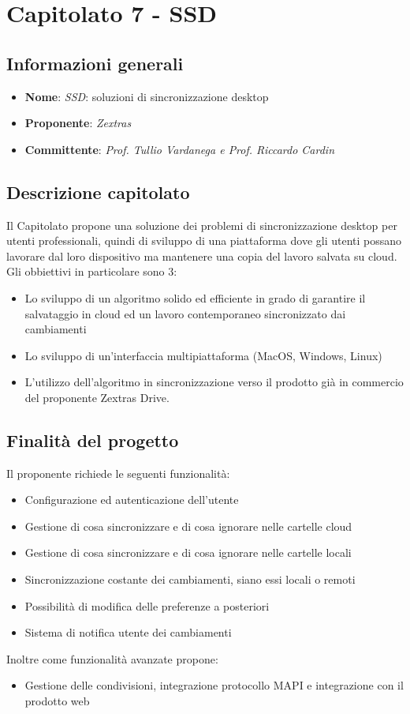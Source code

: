 \section{Capitolato 7 - SSD}
\subsection{Informazioni generali}
\begin{itemize}
    \item \textbf{Nome}: \emph{SSD}: soluzioni di sincronizzazione desktop
    \item \textbf{Proponente}: \emph{Zextras}
    \item \textbf{Committente}: \emph{Prof. Tullio Vardanega e Prof. Riccardo Cardin}
\end{itemize}
\subsection{Descrizione capitolato}
Il Capitolato propone una soluzione dei problemi di sincronizzazione desktop per utenti professionali, quindi di sviluppo di una piattaforma dove gli utenti possano lavorare dal loro dispositivo ma mantenere  una copia del lavoro salvata su cloud.
Gli obbiettivi in particolare sono 3:
\begin{itemize}
    \item Lo sviluppo di un algoritmo solido ed efficiente in grado di garantire il salvataggio in cloud ed un lavoro contemporaneo sincronizzato dai cambiamenti
    \item Lo sviluppo di un'interfaccia multipiattaforma (MacOS, Windows, Linux)
    \item L'utilizzo dell'algoritmo in sincronizzazione verso il prodotto già in commercio del proponente Zextras Drive.
\end{itemize}
\subsection{Finalità del progetto}
Il proponente richiede le seguenti funzionalità:
\begin{itemize}
    \item Configurazione ed autenticazione dell'utente
    \item Gestione di cosa sincronizzare e di cosa ignorare nelle cartelle cloud
    \item Gestione di cosa sincronizzare e di cosa ignorare nelle cartelle locali
    \item Sincronizzazione costante dei cambiamenti, siano essi locali o remoti
    \item Possibilità di modifica delle preferenze a posteriori
    \item Sistema di notifica utente dei cambiamenti
\end{itemize}
Inoltre come funzionalità avanzate propone:
\begin{itemize}
    \item Gestione delle condivisioni, integrazione protocollo MAPI e integrazione con il prodotto web
\end{itemize}

